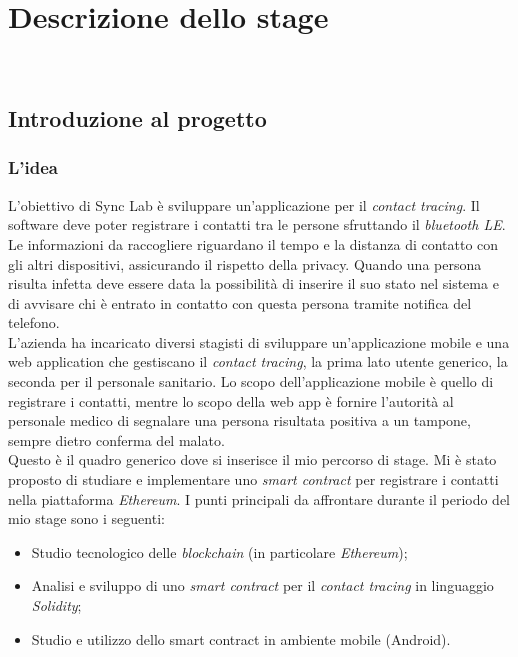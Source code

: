
\chapter{Descrizione dello stage}
\label{cap:descrizione-stage}

\\

\section{Introduzione al progetto}
\subsection{L'idea}
L’obiettivo di Sync Lab è sviluppare un’applicazione per il \emph{\gls{contact tracing}}\glsfirstoccur.
Il software deve poter registrare i contatti tra le persone sfruttando il \emph{\gls{bluetooth LE}}\glsfirstoccur. Le informazioni da raccogliere riguardano il tempo e la distanza di contatto con gli altri dispositivi, assicurando il rispetto della privacy. Quando una persona risulta infetta deve essere data la possibilità di inserire il suo stato nel sistema e di avvisare chi è entrato in contatto con questa persona tramite notifica del telefono.\\

L’azienda ha incaricato diversi stagisti di sviluppare un’applicazione mobile e una web application che gestiscano il \textit{contact tracing}, la prima lato utente generico, la seconda per il personale sanitario. 
Lo scopo dell'applicazione mobile è quello di registrare i contatti, mentre lo scopo della web app è fornire l’autorità al personale medico di segnalare una persona risultata positiva a un tampone, sempre dietro conferma del malato.\\

Questo è il quadro generico dove si inserisce il mio percorso di stage.
Mi è stato proposto di studiare e implementare uno \textit{smart contract} per registrare i contatti nella piattaforma \emph{\gls{Ethereum}}. 
I punti principali da affrontare durante il periodo del mio stage sono i seguenti:
\begin{itemize}
	\item{Studio tecnologico delle \textit{blockchain} (in particolare \textit{Ethereum});}
	\item{Analisi e sviluppo di uno \textit{smart contract} per il \textit{contact tracing} in linguaggio \textit{Solidity};}
	\item{Studio e utilizzo dello smart contract in ambiente mobile (Android).}
\end{itemize}

